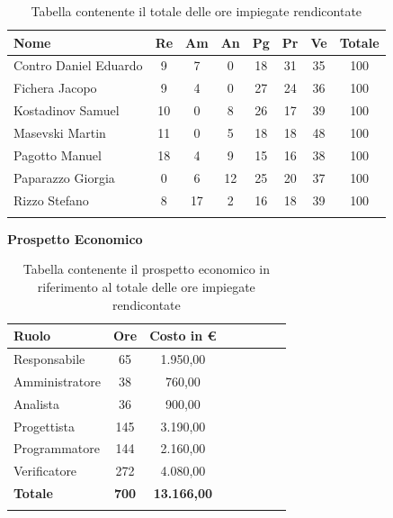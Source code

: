 \documentclass[../piano_di_progetto.tex]{subfiles}
\begin{document}
\begin{center}
	\begin{longtable}{|l|c|c|c|c|c|c|c|}
		\hline
		\rowcolor{lightgray}
		\textbf{Nome} & \textbf{Re} & \textbf{Am} & \textbf{An} & \textbf{Pg}  & \textbf{Pr}   & \textbf{Ve} & \textbf{Totale} \\

		\hline
			Contro Daniel Eduardo & 9 & 7 & 0 & 18 & 31 & 35 & 100 \\
		\hline
			Fichera Jacopo & 9 & 4 & 0 & 27 & 24 & 36 & 100 \\
		\hline
			Kostadinov Samuel & 10 & 0 & 8 & 26 & 17 & 39 & 100 \\		
		\hline
			Masevski Martin & 11 & 0 & 5 & 18 & 18 & 48 & 100 \\
		\hline
			Pagotto Manuel & 18 & 4 & 9 & 15 & 16 & 38 & 100 \\			
		\hline
			Paparazzo Giorgia & 0 & 6 & 12 & 25 & 20 & 37 & 100 \\
		\hline
			Rizzo Stefano & 8 & 17 & 2 & 16 & 18 & 39 & 100 \\
		\hline	

		\caption{Tabella contenente il totale delle ore impiegate rendicontate}
	\end{longtable}
\end{center}

\textbf{Prospetto Economico}

\begin{center}
	\begin{longtable}{|l|c|c|c|c|c|c|c|}
		\hline
		\rowcolor{lightgray}
		\textbf{Ruolo} & \textbf{Ore} & \textbf{Costo in €}\\

		\hline
		Responsabile & 65 & 1.950,00 \\
		\hline
		Amministratore & 38 & 760,00 \\
		\hline
		Analista & 36 & 900,00 \\
		\hline
		Progettista & 145 & 3.190,00 \\
		\hline
		Programmatore & 144 & 2.160,00 \\
		\hline
		Verificatore & 272 & 4.080,00 \\
		\hline
		\textbf{Totale} & \textbf{700} & \textbf{13.166,00}\\
		\hline
		\caption{Tabella contenente il prospetto economico in riferimento al totale delle ore impiegate rendicontate}
	\end{longtable}
\end{center}
\end{document}
